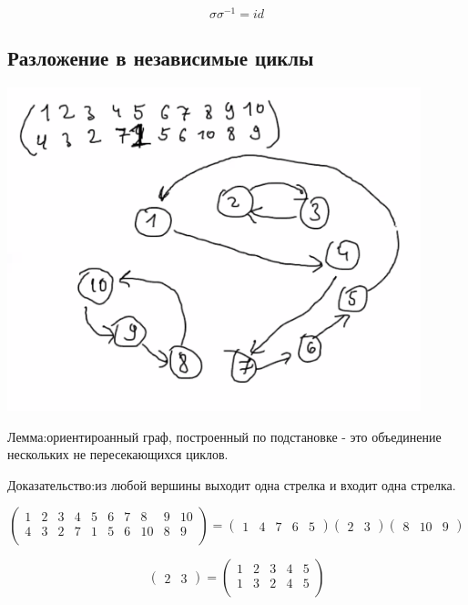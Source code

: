\documentclass[a4paper]{article}
\begin{document}
$$\sigma \sigma^{-1} = id$$

\subsection*{Разложение в независимые циклы}

\includegraphics[width=12cm]{premutations_circle}


Лемма:ориентироанный граф, построенный по подстановке - это объединение нескольких не пересекающихся циклов.

Доказательство:из любой вершины выходит одна стрелка и входит одна стрелка.



\begin{equation*}
\begin{pmatrix}
	1 & 2 & 3 & 4 & 5 & 6 & 7 & 8 & 9 & 10\\
	4 & 3 & 2 & 7 & 1 & 5 & 6 & 10 & 8 & 9\\	
\end{pmatrix}
=
\begin{pmatrix}
	1 & 4 &7 & 6 & 5 
\end{pmatrix}
\begin{pmatrix}
	2 & 3
\end{pmatrix}
\begin{pmatrix}
	8 & 10 & 9
\end{pmatrix}
\end{equation*}


\begin{equation*}
\begin{pmatrix}
	2 & 3
\end{pmatrix}= 
\begin{pmatrix}
	1 & 2 &3 & 4 & 5\\
	1 & 3 &2 & 4 & 5\\
\end{pmatrix}
\end{equation*}
\end{document}
